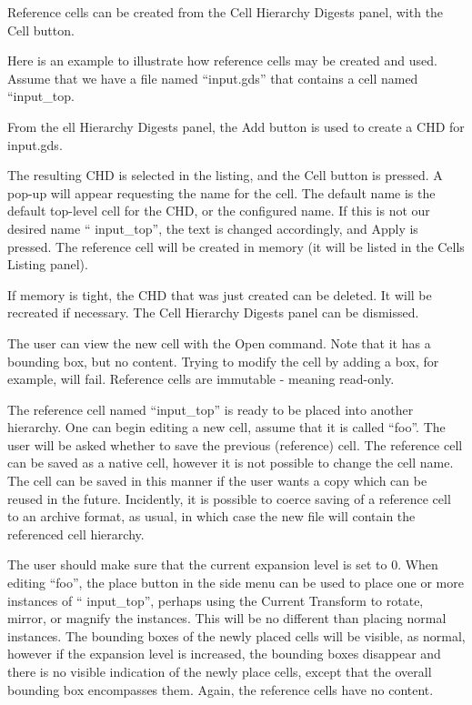 Reference cells can be created from the {\cb Cell Hierarchy Digests}
panel, with the {\cb Cell} button. 

Here is an example to illustrate how reference cells may be created
and used.  Assume that we have a file named ``{\vt input.gds}'' that
contains a cell named ``{\vt input\_top}.

From the {\cb ell Hierarchy Digests} panel, the {\cb Add} button is
used to create a CHD for {\vt input.gds}.

The resulting CHD is selected in the listing, and the {\cb Cell}
button is pressed.  A pop-up will appear requesting the name for the
cell.  The default name is the default top-level cell for the CHD, or
the configured name.  If this is not our desired name ``{\vt
input\_top}'', the text is changed accordingly, and {\cb Apply} is
pressed.  The reference cell will be created in memory (it will be
listed in the {\cb Cells Listing} panel).

If memory is tight, the CHD that was just created can be deleted.  It
will be recreated if necessary.  The {\cb Cell Hierarchy Digests}
panel can be dismissed.

The user can view the new cell with the {\cb Open} command.  Note that
it has a bounding box, but no content.  Trying to modify the cell by
adding a box, for example, will fail.  Reference cells are immutable -
meaning read-only.

The reference cell named ``{\vt input\_top}'' is ready to be placed
into another hierarchy.  One can begin editing a new cell, assume that
it is called ``{\vt foo}''.  The user will be asked whether to save
the previous (reference) cell.  The reference cell can be saved as a
native cell, however it is not possible to change the cell name.  The
cell can be saved in this manner if the user wants a copy which can be
reused in the future.  Incidently, it is possible to coerce saving of
a reference cell to an archive format, as usual, in which case the new
file will contain the referenced cell hierarchy.

The user should make sure that the current expansion level is set to
0.  When editing ``{\vt foo}'', the {\cb place} button in the side
menu can be used to place one or more instances of ``{\vt
input\_top}'', perhaps using the {\cb Current Transform} to rotate,
mirror, or magnify the instances.  This will be no different than
placing normal instances.  The bounding boxes of the newly placed
cells will be visible, as normal, however if the expansion level is
increased, the bounding boxes disappear and there is no visible
indication of the newly place cells, except that the overall bounding
box encompasses them.  Again, the reference cells have no content.

